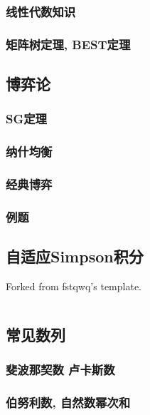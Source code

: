 \documentclass[a4paper, twoside]{article}
\begin{document}
\begin{multicols}{2}
				\subsubsection{线性代数知识}
					
				
				\subsubsection{矩阵树定理, BEST定理}
					
			
			\subsection{博弈论}
				\subsubsection{SG定理}
					

				\subsubsection{纳什均衡}
					

				\subsubsection{经典博弈}
					

				\subsubsection{例题}

			\subsection{自适应Simpson积分}
				Forked from fstqwq's template.
				\inputminted{cpp}{../src/math/simpson.cpp}

			\subsection{常见数列}
				\subsubsection{斐波那契数 卢卡斯数}
					

				\subsubsection{伯努利数, 自然数幂次和}
					
				

\end{multicols}
\end{document}
